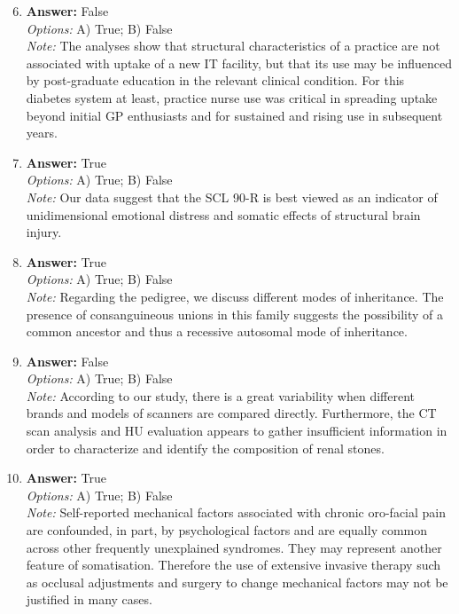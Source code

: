 \documentclass[12pt]{article}
\begin{document}
\begin{enumerate}[label=\arabic*.]
\setcounter{enumi}{5}
\item \textbf{Answer:} False
\\ \textit{Options:} A) True; B) False
\\ \textit{Note:} The analyses show that structural characteristics of a practice are not associated with uptake of a new IT facility, but that its use may be influenced by post-graduate education in the relevant clinical condition. For this diabetes system at least, practice nurse use was critical in spreading uptake beyond initial GP enthusiasts and for sustained and rising use in subsequent years.
\item \textbf{Answer:} True
\\ \textit{Options:} A) True; B) False
\\ \textit{Note:} Our data suggest that the SCL 90-R is best viewed as an indicator of unidimensional emotional distress and somatic effects of structural brain injury.
\item \textbf{Answer:} True
\\ \textit{Options:} A) True; B) False
\\ \textit{Note:} Regarding the pedigree, we discuss different modes of inheritance. The presence of consanguineous unions in this family suggests the possibility of a common ancestor and thus a recessive autosomal mode of inheritance.
\item \textbf{Answer:} False
\\ \textit{Options:} A) True; B) False
\\ \textit{Note:} According to our study, there is a great variability when different brands and models of scanners are compared directly. Furthermore, the CT scan analysis and HU evaluation appears to gather insufficient information in order to characterize and identify the composition of renal stones.
\item \textbf{Answer:} True
\\ \textit{Options:} A) True; B) False
\\ \textit{Note:} Self-reported mechanical factors associated with chronic oro-facial pain are confounded, in part, by psychological factors and are equally common across other frequently unexplained syndromes. They may represent another feature of somatisation. Therefore the use of extensive invasive therapy such as occlusal adjustments and surgery to change mechanical factors may not be justified in many cases.
\end{enumerate}
\end{document}
